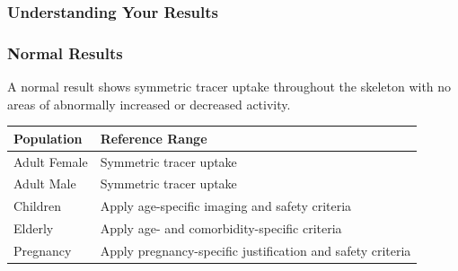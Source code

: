 \subsubsection*{Understanding Your Results}

\subsubsection*{Normal Results}
A normal result shows symmetric tracer uptake throughout the skeleton with no areas of abnormally increased or decreased activity.

\begin{center}
\begin{tabular}{ll}
\toprule
\textbf{Population} & \textbf{Reference Range} \\
\midrule
Adult Female & Symmetric tracer uptake \\
Adult Male & Symmetric tracer uptake \\
Children & Apply age-specific imaging and safety criteria \\
Elderly & Apply age- and comorbidity-specific criteria \\
Pregnancy & Apply pregnancy-specific justification and safety criteria \\
\bottomrule
\end{tabular}
\end{center}
\clearpage
